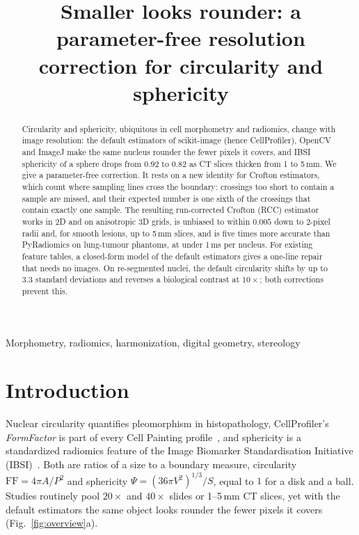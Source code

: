 \documentclass{article}
\title{Smaller looks rounder: a parameter-free resolution correction for circularity and sphericity}
\newcommand{\ff}{\mathrm{FF}}
\begin{document}
\maketitle

\begin{abstract}
Circularity and sphericity, ubiquitous in cell morphometry and radiomics, change with image resolution: the default estimators of scikit-image (hence CellProfiler), OpenCV and ImageJ make the same nucleus rounder the fewer pixels it covers, and IBSI sphericity of a sphere drops from $0.92$ to $0.82$ as CT slices thicken from 1 to 5\,mm. We give a parameter-free correction. It rests on a new identity for Crofton estimators, which count where sampling lines cross the boundary: crossings too short to contain a sample are missed, and their expected number is one sixth of the crossings that contain exactly one sample. The resulting run-corrected Crofton (RCC) estimator works in 2D and on anisotropic 3D grids, is unbiased to within $0.005$ down to 2-pixel radii and, for smooth lesions, up to 5\,mm slices, and is five times more accurate than PyRadiomics on lung-tumour phantoms, at under 1\,ms per nucleus. For existing feature tables, a closed-form model of the default estimators gives a one-line repair that needs no images. On re-segmented nuclei, the default circularity shifts by up to $3.3$ standard deviations and reverses a biological contrast at $10\times$; both corrections prevent this.
\end{abstract}

\begin{keywords}
Morphometry, radiomics, harmonization, digital geometry, stereology
\end{keywords}

\section{Introduction}
\label{sec:intro}
Nuclear circularity quantifies pleomorphism in histopathology, CellProfiler's \emph{FormFactor} is part of every Cell Painting profile~\cite{bray2016,stirling2021}, and sphericity is a standardized radiomics feature of the Image Biomarker Standardisation Initiative (IBSI)~\cite{zwanenburg2020}. Both are ratios of a size to a boundary measure, circularity $\ff=4\pi A/P^2$ and sphericity $\Psi=(36\pi V^2)^{1/3}/S$, equal to $1$ for a disk and a ball. Studies routinely pool $20\times$ and $40\times$ slides or 1--5\,mm CT slices, yet with the default estimators the same object looks rounder the fewer pixels it covers (Fig.~\ref{fig:overview}a).
\end{document}
